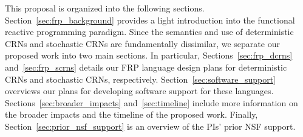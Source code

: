 This proposal is organized into the following sections.
Section~\ref{sec:frp_background} provides a light introduction into the functional reactive programming paradigm.
Since the semantics and use of deterministic CRNs and stochastic CRNs are fundamentally dissimilar, we separate our proposed work into two main sections.
In particular, Sections~\ref{sec:frp_dcrns} and~\ref{sec:frp_scrns} details our FRP language design plans for deterministic CRNs and stochastic CRNs, respectively.
Section~\ref{sec:software_support} overviews our plans for developing software support for these languages.
Sections~\ref{sec:broader_impacts} and~\ref{sec:timeline} include more information on the broader impacts and the timeline of the proposed work.
Finally, Section~\ref{sec:prior_nsf_support} is an overview of the PIs' prior NSF support.



